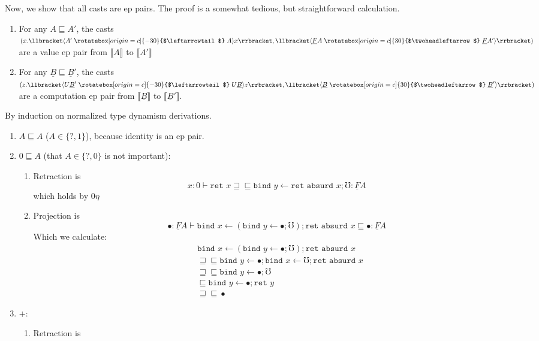 \documentclass[acmsmall,screen,12pt]{acmart}
\renewcommand{\u}{\underline}
\newcommand{\sem}[1]{\llbracket#1\rrbracket}
\newcommand{\ltdyn}{\sqsubseteq}
\newcommand{\gtdyn}{\sqsupseteq}
\newcommand{\equidyn}{\mathrel{\gtdyn\ltdyn}}
\newcommand{\dyn}{{?}}
\newcommand{\uarrow}{\mathrel{\rotatebox[origin=c]{-30}{$\leftarrowtail$}}}
\newcommand{\darrow}{\mathrel{\rotatebox[origin=c]{30}{$\twoheadleftarrow$}}}
\newcommand{\upcast}[2]{\langle{#2}\uarrow{#1}\rangle}
\newcommand{\dncast}[2]{\langle{#1}\darrow{#2}\rangle}
\newcommand{\err}{\mho}
\newcommand{\bindXtoYinZ}[2]{\kw{bind}#2 \leftarrow #1;}
\newcommand{\kw}[1]{\texttt{#1}\,\,}
\newcommand{\absurd}{\kw{absurd}}
\newcommand{\ret}{\kw{ret}}
\begin{document}
\begin{longonly}
Now, we show that all casts are ep pairs.
%
The proof is a somewhat tedious, but straightforward calculation.

\begin{lemma}\hfill
  \label{lem:casts-are-ep-pairs}
  \begin{enumerate}
  \item For any $A \ltdyn A'$, the casts $(x.\sem{\upcast{A}{A'}x},
    \sem{\dncast{\u F A}{\u F A'}})$ are a value ep pair from
    $\sem{A}$ to $\sem{A'}$
  \item For any $\u B \ltdyn \u B'$, the casts $(z. \sem{\upcast{U \u
      B}{U \u B'}z}, \sem{\dncast{\u B}{\u B'}})$ are a computation ep
    pair from $\sem{\u B}$ to $\sem{\u B'}$.
  \end{enumerate}
\end{lemma}
\begin{longproof}
  By induction on normalized type dynamism derivations.
  \begin{enumerate}
  \item $A \ltdyn A$ ($A \in \{\dyn, 1\}$), because identity is an ep pair.
  \item $0 \ltdyn A$ (that $A \in \{ \dyn, 0 \}$ is not important):
    \begin{enumerate}
    \item Retraction is
      \[ x : 0 \vdash \ret x \equidyn \bindXtoYinZ {\ret\absurd x} y \err : \u F A \]
      which holds by $0\eta$
    \item Projection is
      \[ \bullet : \u F A \vdash \bindXtoYinZ {(\bindXtoYinZ \bullet y \err)} x {\ret\absurd x} \ltdyn \bullet : \u F A \]
      Which we calculate:
      \begin{align*}
        &\bindXtoYinZ {(\bindXtoYinZ \bullet y \err)} x {\ret\absurd x}\\
        &\equidyn \bindXtoYinZ \bullet y \bindXtoYinZ \err x {\ret\absurd x}\tag{comm conv}\\
        &\equidyn \bindXtoYinZ \bullet y \err \tag{Strictness of Stacks}\\
        &\ltdyn \bindXtoYinZ \bullet y \ret y \tag{$\err$ is $\bot$}\\
        &\equidyn \bullet \tag{$\u F\eta$}
      \end{align*}
    \end{enumerate}
  \item $+$:
    \begin{enumerate}
    \item Retraction is
      \begin{align*}

\end{align*}
\end{enumerate}
\end{enumerate}
\end{longproof}
\end{longonly}
\end{document}
